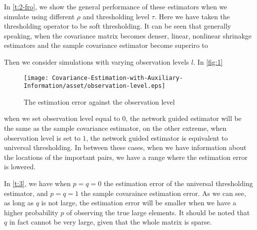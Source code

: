 

In \autoref{t:2-fro}, we show the general performance of these estimators when we simulate using different \(\rho\) and thresholding level \(\tau\). Here we have taken the thresholding operator to be soft thresholding. It can be seen that generally speaking, when the covariance matrix becomes denser, linear, nonlinear shrinakge estimators and the sample covariance estimator become superiro to 

Then we consider simulations with varying observation levels \(l\). In \autoref{fig:1}
\begin{figure}[htbp]
     \centering
     \texttt{[image: Covariance-Estimation-with-Auxiliary-Information/asset/observation-level.eps]}
     \caption{The estimation error against the observation level}
     \label{fig:1}
\end{figure}
when we set observation level equal to \(0\), the network guided estimator will be the same as the sample covariance estimator, on the other extreme, when observation level is set to \(1\), the network guided estimator is equivalent to universal thresholding. In between these cases, when we have information about the locations of the important pairs, we have a range where the estimation error is lowered. 



In \autoref{t:3}, we have when \(p = q = 0\) the estimation error of the universal thresholding estimator, and \(p =q =1\) the sample covaraince estimation error. As we can see, as long as \(q\) is not large, the estimation error will be smaller when we have a higher probability \(p\) of observing the true large elements. It should be noted that \(q\) in fact cannot be very large, given that the whole matrix is sparse. 
